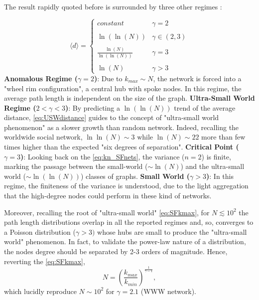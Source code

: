 \documentclass[a4paper,10pt,twoside]{book} %
\theoremstyle{definition}
\begin{document}
The result rapidly quoted before is surrounded by three other regimes 
\cite{Cohen:2003_SFUSW}:

\begin{equation}
	\langle d \rangle = 
	\begin{cases}
		constant & \gamma = 2 \\ \\
		\ln(\ln(N)) & \gamma \in (2,3) \\ \\
		\frac{\ln(N)}{\ln(\ln(N))} & \gamma = 3 \\ \\
		\ln(N) & \gamma > 3
	\end{cases}
	\label{eq:USWdistance}
\end{equation}
\newline
\textbf{Anomalous Regime ($\gamma = 2$)}: Due to $k_{max} \sim N$, the network is forced into a "wheel rim configuration", a central hub with spoke nodes. In this regime, the average path length is independent on the size of the graph.
\newline
\textbf{Ultra-Small World Regime ($2 < \gamma < 3$)}: By predicting a $\ln(\ln(N))$ trend of the average distance, \autoref{eq:USWdistance} guides to the concept of "ultra-small world phenomenon" as a slower growth than random network. Indeed, recalling the worldwide social network, \(\ln\ln(N) \sim 3 \text{ while } \ln(N) \sim 22\) more than few times higher than the expected "six degrees of separation".
\newline
\textbf{Critical Point ($\gamma = 3$)}: Looking back on the \autoref{eq:kn_SFnets}, the variance ($n=2$) is finite, marking the passage between the small-world ($\sim \ln(N)$) and the ultra-small world ($\sim \ln(\ln(N))$) classes of graphs.
\newline
\textbf{Small World ($\gamma > 3$)}:
In this regime, the finiteness of the variance is understood, due to the light aggregation that the high-degree nodes could perform in these kind of networks.

Moreover, recalling the root of "ultra-small world" \autoref{eq:SFkmax}, for $N \lesssim 10^2$ the path length distributions overlap in all the reported regimes and, so, converges to a Poisson distribution ($\gamma > 3)$ whose hubs are small to produce the "ultra-small world" phenomenon. In fact, to validate the power-law nature of a distribution, the nodes degree should be separated by 2-3 orders of magnitude. Hence, reverting the \autoref{eq:SFkmax},
\[N = \left(\frac{k_{max}}{k_{min}} \right)^\frac{1}{\gamma -1},\]
which lucidly reproduce $N \sim 10^2$ for $\gamma = 2.1$ (WWW network).
\end{document}
